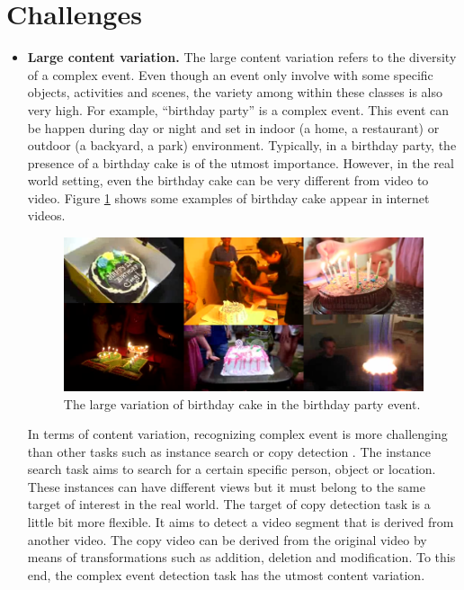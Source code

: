 \section{Challenges}
\label{c1_challenges}
\begin{itemize}
	\item{\textbf{Large content variation.}} The large content variation refers to the diversity of a complex event. Even though an event only involve with some specific objects, activities and scenes, the variety among within these classes is also very high. For example, ``birthday party'' is a complex event. This event can be happen during day or night and set in indoor (a home, a restaurant) or outdoor (a backyard, a park) environment. Typically, in a birthday party, the presence of a birthday cake is of the utmost importance. However, in the real world setting, even the birthday cake can be very different from video to video. Figure \ref{c1_largecontent} shows some examples of birthday cake appear in internet videos. 
	\begin{figure}
		\centering
		\includegraphics[width=1\textwidth]{largecontent.png}
		\caption{The large variation of birthday cake in the birthday party event.}
		\label{c1_largecontent}
	\end{figure}
	
	In terms of content variation, recognizing complex event is more challenging than other tasks such as instance search  or copy detection . The instance search task aims to search for a certain specific person, object or location. These instances can have different views but it must belong to the same target of interest in the real world. The target of copy detection task is a little bit more flexible. It aims to detect a video segment that is derived from another video. The copy video can be derived from the original video by means of transformations such as addition, deletion and modification. To this end, the complex event detection task has the utmost content variation.
	 

\end{itemize}
